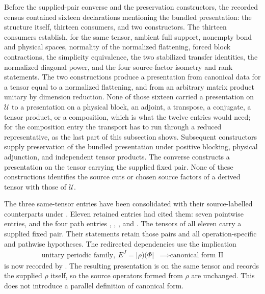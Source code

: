 \documentclass{article}
\begin{document}
Before the supplied-pair converse and the preservation constructors, the
recorded census contained sixteen declarations mentioning the bundled
presentation: the structure itself, thirteen consumers, and two constructors.
The thirteen consumers establish, for the same tensor, ambient full support,
nonempty bond and physical spaces, normality of the normalized flattening,
forced block contractions, the simplicity equivalence, the two stabilized
transfer identities, the normalized diagonal power, and the four source-factor
isometry and rank statements. The two constructions produce
a presentation from canonical data for a tensor equal to a normalized
flattening, and from an arbitrary matrix product unitary by dimension
reduction. None of those sixteen carried a presentation on $\mathcal U$ to a
presentation on a physical block, an adjoint, a transpose, a conjugate, a
tensor product, or a composition, which is what the twelve entries would need;
for the composition entry the transport has to run through a reduced
representative, as the last part of this subsection shows. Subsequent
constructors supply preservation of the bundled presentation under positive
blocking, physical adjunction, and independent tensor products. The converse
constructs a presentation on the tensor carrying the supplied fixed pair.
None of these constructions identifies the source cuts or chosen source
factors of a derived tensor with those of $\mathcal U$.

The three same-tensor entries have been consolidated with their source-labelled
counterparts under . Eleven retained entries had cited them:
seven pointwise entries, and the four path entries
,
,
, and
. The tensors of all
eleven carry a supplied fixed pair. Their statements retain those pairs and
all operation-specific and pathwise hypotheses. The redirected dependencies
use the implication
\begin{align}
    \text{unitary periodic family},\ E^{J}=\lvert\rho)(\Phi\rvert
     & \implies\text{canonical form II}
    \label{eq:mpu_canonical_form_full_support_datum_to_convention}
\end{align}
is now recorded by
.
The resulting presentation is on the same tensor and records the supplied
$\rho$ itself, so the source operators formed from $\rho$ are unchanged. This
does not introduce a parallel definition of canonical form.
\end{document}
